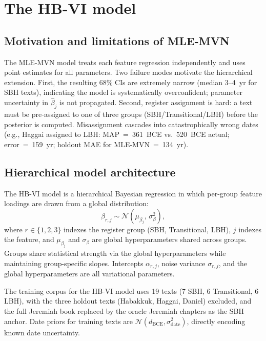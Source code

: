 \documentclass[10pt,letterpaper]{article}
\newcommand{\mvn}{MLE-MVN}
\newcommand{\hbvi}{HB-VI}
\begin{document}
\section*{The HB-VI model}

\subsection*{Motivation and limitations of MLE-MVN}

The \mvn{} model treats each feature regression independently and uses
point estimates for all parameters.  Two failure modes motivate the
hierarchical extension.  First, the resulting 68\% CIs are extremely
narrow (median 3--4~yr for SBH texts), indicating the model is
systematically overconfident; parameter uncertainty in $\hat{\beta}_j$
is not propagated.  Second, register assignment is hard: a text must be
pre-assigned to one of three groups (SBH/Transitional/LBH) before the
posterior is computed.  Misassignment cascades into catastrophically
wrong dates (e.g., Haggai assigned to LBH: MAP~=~361~BCE vs.\ 520~BCE
actual; error~=~159~yr; holdout MAE for \mvn{}~=~134~yr).

\subsection*{Hierarchical model architecture}

The \hbvi{} model is a hierarchical Bayesian regression in which
per-group feature loadings are drawn from a global distribution:
%
\begin{equation}
  \beta_{r,j} \sim \mathcal{N}(\mu_{\beta_j},\, \sigma_\beta^2),
  \label{eq:hbvi_prior}
\end{equation}
%
where $r \in \{1,2,3\}$ indexes the register group (SBH, Transitional,
LBH), $j$ indexes the feature, and $\mu_{\beta_j}$ and $\sigma_\beta$ are
global hyperparameters shared across groups.  Groups share statistical
strength via the global hyperparameters while maintaining group-specific
slopes.  Intercepts $\alpha_{r,j}$, noise variance $\sigma_{r,j}$, and
the global hyperparameters are all variational parameters.

The training corpus for the \hbvi{} model uses 19 texts (7 SBH,
6 Transitional, 6 LBH), with the three holdout texts (Habakkuk, Haggai,
Daniel) excluded, and the full Jeremiah book replaced by the oracle Jeremiah
chapters as the SBH anchor.  Date priors for training texts are
$\mathcal{N}(d_{\text{BCE}}, \sigma_{\text{date}}^2)$, directly encoding
known date uncertainty.
\end{document}
